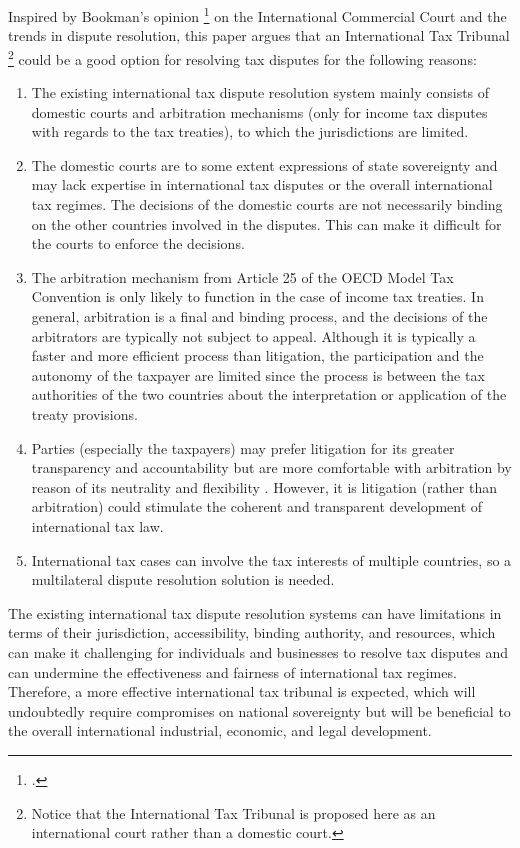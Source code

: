 Inspired by Bookman's opinion \footcite{Bookman2019} on the International Commercial Court and the trends in dispute resolution, this paper argues that an International Tax Tribunal 
\footnote{Notice that the International Tax Tribunal is proposed here as an international court rather than a domestic court.} 
could be a good option for resolving tax disputes for the following reasons:

\begin{enumerate}
  \item The existing international tax dispute resolution system mainly consists of domestic courts and arbitration mechanisms (only for income tax disputes with regards to the tax treaties), to which the jurisdictions are limited.
  \item The domestic courts are to some extent expressions of state sovereignty and may lack expertise in international tax disputes or the overall international tax regimes. The decisions of the domestic courts are not necessarily binding on the other countries involved in the disputes. This can make it difficult for the courts to enforce the decisions.
  \item The arbitration mechanism from Article 25 of the OECD Model Tax Convention is only likely to function in the case of income tax treaties. In general, arbitration is a final and binding process, and the decisions of the arbitrators are typically not subject to appeal. Although it is typically a faster and more efficient process than litigation, the participation and the autonomy of the taxpayer are limited since the process is between the tax authorities of the two countries about the interpretation or application of the treaty provisions.
  \item Parties (especially the taxpayers) may prefer litigation for its greater transparency and accountability
  but are more
  comfortable with arbitration by reason of its neutrality and flexibility
  .
  However, it is litigation (rather than arbitration) could stimulate the coherent and transparent development of international tax law.

  \item  International tax cases can involve the tax interests of multiple countries, so a multilateral dispute resolution solution is needed.
\end{enumerate}

The existing international tax dispute resolution systems can have limitations in terms of their jurisdiction, accessibility, binding authority, and resources, which can make it challenging for individuals and businesses to resolve tax disputes and can undermine the effectiveness and fairness of international tax regimes. Therefore, a more effective international tax tribunal is expected, which will undoubtedly require compromises on national sovereignty but will be beneficial to the overall international industrial, economic, and legal development.

